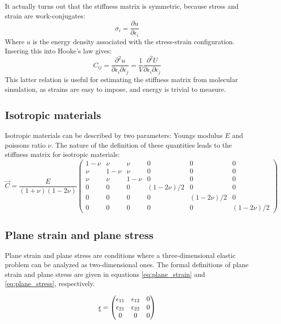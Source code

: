 It actually turns out that the stiffness matrix is symmetric, because stress and strain are work-conjugates:
\begin{equation}
	\sigma_i = \frac{\partial u}{\partial \epsilon_i}
\end{equation}
Where $u$ is the energy density associated with the stress-strain configuration.
Insering this into Hooke's law gives:
\begin{equation}
	C_{ij}=\frac{\partial^2 u}{\partial \epsilon_i \partial \epsilon_j} = \frac{1}{V} \frac{\partial^2 U}{\partial \epsilon_i \partial \epsilon_j} 
\end{equation}
This latter relation is useful for estimating the stiffness matrix from molecular simulation, as strains are easy to impose, and energy is trivial to measure.

\subsection{Isotropic materials}
Isotropic materials can be described by two parameters: Youngs modulus $E$ and poissons ratio $\nu$. The nature of the definition of these quantities leads to the stiffness matrix for isotropic materials:
\begin{equation}
	\vec{C} = 
   	\frac{E}{(1+\nu)(1-2\nu)}
   	\begin{pmatrix}
		1-\nu & \nu & \nu & 0 & 0 & 0 \\
		\nu & 1-\nu & \nu & 0 & 0 & 0 \\
		   \nu & \nu & 1-\nu & 0 & 0 & 0 \\
		   0 & 0 & 0 & (1-2\nu)/2 & 0 & 0 \\
		   0 & 0 & 0 & 0 & (1-2\nu)/2 & 0 \\
		   0 & 0 & 0 & 0 & 0 & (1-2\nu)/2
	\end{pmatrix}
\end{equation}

\subsection{Plane strain and plane stress}
Plane strain and plane stress are conditions where a three-dimensional elastic problem can be analyzed as two-dimensional ones. The formal definitions of plane strain and plane stress are given in equations \ref{eq:plane_strain} and \ref{eq:plane_stress}, respectively.

\begin{equation}
\uuline \epsilon = 
\begin{pmatrix}
	\epsilon_{11} & \epsilon_{12} & 0 \\
	\epsilon_{21} & \epsilon_{22} & 0 \\
	0 & 0 & 0
\end{pmatrix}
\label{eq:plane_strain}
\end{equation}

